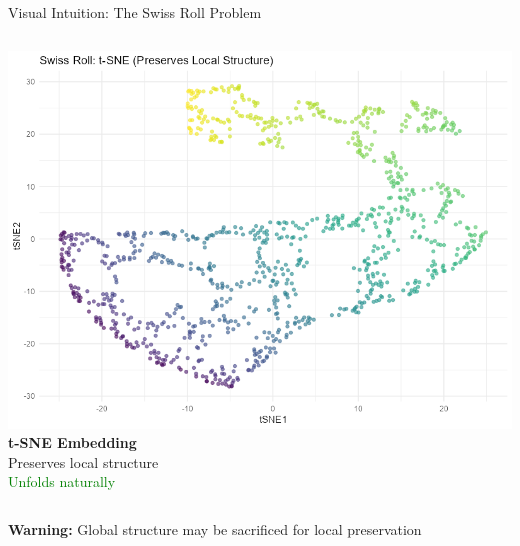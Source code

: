 \documentclass[aspectratio=169]{beamer}
\newcommand{\warning}[1]{\colorbox{red!10}{\textcolor{warningcolor}{\textbf{Warning:} #1}}}
\begin{document}
\begin{frame}{Visual Intuition: The Swiss Roll Problem}
\begin{columns}
\includegraphics[width=\textwidth]{./Figures/swiss_roll_tsne.png}
\textbf{t-SNE Embedding}\\
Preserves local structure\\
\textcolor{green}{Unfolds naturally}
\end{columns}

\vspace{0.3cm}
\warning{Global structure may be sacrificed for local preservation}
\end{frame}
\end{document}

